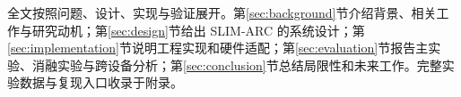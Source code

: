 全文按照问题、设计、实现与验证展开。第\ref{sec:background}节介绍背景、相关工作与研究动机；第\ref{sec:design}节给出 SLIM-ARC 的系统设计；第\ref{sec:implementation}节说明工程实现和硬件适配；第\ref{sec:evaluation}节报告主实验、消融实验与跨设备分析；第\ref{sec:conclusion}节总结局限性和未来工作。完整实验数据与复现入口收录于附录。
